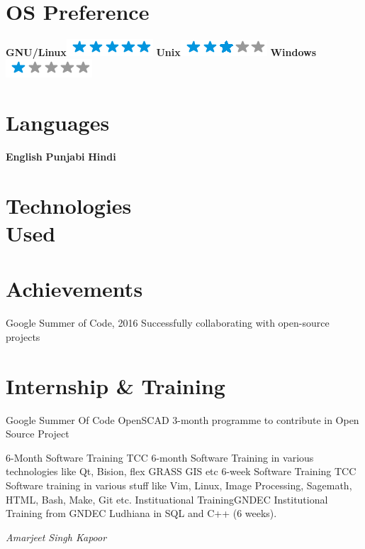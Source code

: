 \documentclass[]{friggeri-cv}
\begin{document}
\\
\newpage

\begin{aside}
  \section{OS Preference}
    \textbf{GNU/Linux}\includegraphics[scale=0.40]{img/5stars.png}
    \textbf{Unix}\includegraphics[scale=0.40]{img/3stars.png}
    \textbf{Windows}\includegraphics[scale=0.40]{img/1stars.png}
    ~
  \section{Languages}
    \textbf{English}
    \textbf{Punjabi}
    \textbf{Hindi}
    ~
  \section{Technologies \\ Used}
\end{aside}

\section{Achievements}
\begin{entrylist}
  \entry{}
    {Google Summer of Code, 2016}
    {}{}
    \entry{}
    {
        Successfully collaborating with open-source projects 
    }{}{}

\end{entrylist}

\section{Internship \& Training}
    \begin{entrylist}
    \entry
    {}
    {Google Summer Of Code }  
    {OpenSCAD}
    {3-month programme to contribute in Open Source Project }
    
    \entry
    {}
    {6-Month Software Training }
    {TCC}
    {6-month Software Training in various technologies like Qt, Bision, flex GRASS GIS etc}
    \entry
    {}
    {6-week Software Training}  
    {TCC}
    {
        Software training in various stuff like Vim, Linux, Image Processing, Sagemath, HTML, Bash, Make, Git etc.
    }
    \entry
    {}
    {Instituational Training}{GNDEC} 
    {
    Institutional Training from GNDEC Ludhiana in SQL and C++ (6 weeks).}
\end{entrylist}

\begin{flushright}
\emph{Amarjeet Singh Kapoor}
\end{flushright}
\end{document}
